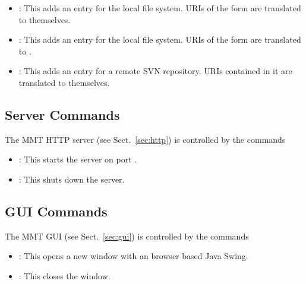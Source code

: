 \begin{itemize}
\item {}: This adds an entry for the local file system. URIs of the form  are translated to themselves.
\item {}: This adds an entry for the local file system. URIs of the form  are translated to .
\item {}: This adds an entry for a remote SVN repository. URIs contained in it are translated to themselves.
\end{itemize}

\subsection{Server Commands}\label{sec:shell:server}
The MMT HTTP server (see Sect.~\ref{sec:http}) is controlled by the commands
\begin{itemize}
\item {}: This starts the server on port .
\item {}: This shuts down the server.
\end{itemize}

\subsection{GUI Commands}
The MMT GUI (see Sect.~\ref{sec:gui}) is controlled by the commands
\begin{itemize}
\item {}: This opens a new window with an \mmt browser based Java Swing.
\item {}: This closes the window.
\end{itemize}

